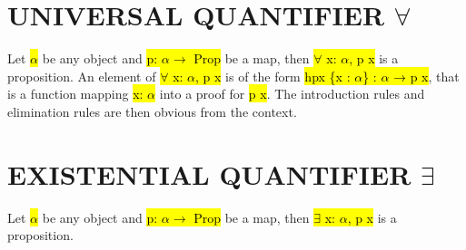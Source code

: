 \section{UNIVERSAL QUANTIFIER $\forall$}

Let \hl{$\alpha$} be any object and \hl{p: $\alpha \to$ Prop} be a map, then \hl{$\forall$ x: $\alpha$, p x} is a proposition. An element of \hl{$\forall$ x: $\alpha$, p x} is of the form \hl{hpx \{x : $\alpha$\} : $\alpha$ → p x}, that is a function mapping \hl{x: $\alpha$} into a proof for \hl{p x}. The introduction rules and elimination rules are then obvious from the context.

\section{EXISTENTIAL QUANTIFIER $\exists$}

Let \hl{$\alpha$} be any object and \hl{p: $\alpha \to$ Prop} be a map, then \hl{$\exists$ x: $\alpha$, p x} is a proposition.

